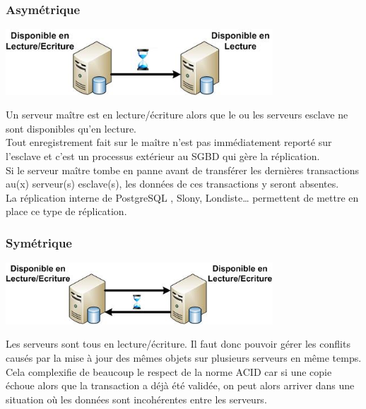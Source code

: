 \documentclass[12pt]{report}
\begin{document}
\subsubsection{Asymétrique}

\begin{center}
\includegraphics[width=0.75\textwidth]{./Dessin3.jpg}
\end{center}

Un serveur maître est en lecture/écriture alors que le ou les serveurs esclave
ne sont disponibles qu’en lecture. \\

Tout enregistrement fait sur le maître n'est pas immédiatement reporté sur
l'esclave et c’est un processus extérieur au SGBD qui gère la réplication. \\

Si le serveur maître tombe en panne avant de transférer les dernières
transactions au(x) serveur(s) esclave(s), les données de ces transactions y
seront absentes. \\

La réplication interne de PostgreSQL , Slony, Londiste… permettent de mettre en
place ce type de réplication.\\

\subsubsection{Symétrique}

\begin{center}
\includegraphics[width=0.75\textwidth]{./Dessin4.jpg}
\end{center}

Les serveurs sont tous en lecture/écriture. Il faut donc pouvoir gérer les
conflits causés par la mise à jour des mêmes objets sur plusieurs serveurs en
même temps. Cela complexifie de beaucoup le respect de la norme ACID car si une
copie échoue alors que la transaction a déjà été validée, on peut alors arriver
dans une situation où les données sont incohérentes entre les serveurs. \\
\end{document}
